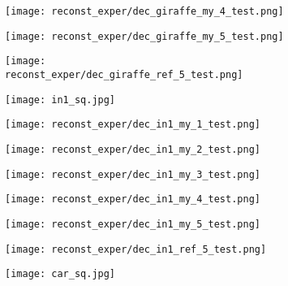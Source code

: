 \begin{figure}[H]
\begin{subfigure}[b]{0.13\linewidth}
	\end{subfigure}
	\begin{subfigure}[b]{0.13\linewidth}
		\texttt{[image: reconst\_exper/dec\_giraffe\_my\_4\_test.png]} %
	\end{subfigure}
	\begin{subfigure}[b]{0.13\linewidth}
		\texttt{[image: reconst\_exper/dec\_giraffe\_my\_5\_test.png]} %
	\end{subfigure}
	\begin{subfigure}[b]{0.13\linewidth}
		\texttt{[image: reconst\_exper/dec\_giraffe\_ref\_5\_test.png]} %
	\end{subfigure}
	\centering
	\begin{subfigure}[b]{0.13\linewidth}
		\texttt{[image: in1\_sq.jpg]} %
	\end{subfigure}
	\begin{subfigure}[b]{0.13\linewidth}
		\texttt{[image: reconst\_exper/dec\_in1\_my\_1\_test.png]} %
	\end{subfigure}
	\begin{subfigure}[b]{0.13\linewidth}
		\texttt{[image: reconst\_exper/dec\_in1\_my\_2\_test.png]} %
	\end{subfigure}
	\begin{subfigure}[b]{0.13\linewidth}
		\texttt{[image: reconst\_exper/dec\_in1\_my\_3\_test.png]} %
	\end{subfigure}
	\begin{subfigure}[b]{0.13\linewidth}
		\texttt{[image: reconst\_exper/dec\_in1\_my\_4\_test.png]} %
	\end{subfigure}
	\begin{subfigure}[b]{0.13\linewidth}
		\texttt{[image: reconst\_exper/dec\_in1\_my\_5\_test.png]} %
	\end{subfigure}
	\begin{subfigure}[b]{0.13\linewidth}
		\texttt{[image: reconst\_exper/dec\_in1\_ref\_5\_test.png]} %
	\end{subfigure}
	\centering
	\begin{subfigure}[b]{0.13\linewidth}
		\texttt{[image: car\_sq.jpg]} %

\end{subfigure}
\end{figure}
